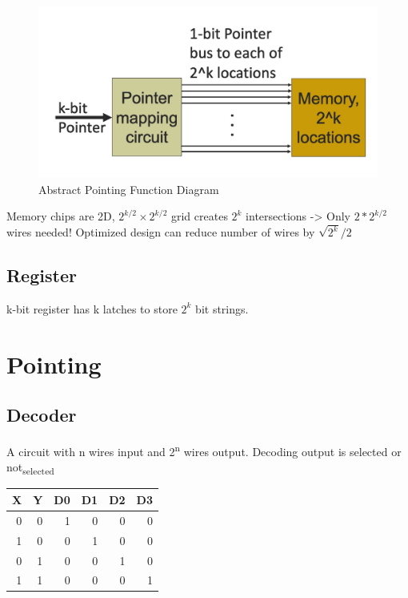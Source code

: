 \documentclass[11pt]{article}
\begin{document}
\begin{figure}[htbp]
\centering
\includegraphics[width=.9\linewidth]{./img/pointing_function.jpg}
\caption{\label{fig:org0ec129b}Abstract Pointing Function Diagram}
\end{figure}

Memory chips are 2D, \(2^{k/2} \times 2^{k/2}\) grid creates \(2^k\) intersections -> Only \(2 * 2^{k/2}\) wires needed! Optimized design can reduce number of wires by \(\sqrt{2^k} / 2\)

\subsection{Register}
\label{sec:org235d5f8}

k-bit register has k latches to store \(2^k\) bit strings.

\section{Pointing}
\label{sec:org9374411}

\subsection{Decoder}
\label{sec:org2ce7f15}

A circuit with n wires input and 2\textsuperscript{n} wires output. Decoding output is selected or not\textsubscript{selected}

\begin{center}
\begin{tabular}{rrrrrr}
X & Y & D0 & D1 & D2 & D3\\
\hline
0 & 0 & 1 & 0 & 0 & 0\\
1 & 0 & 0 & 1 & 0 & 0\\
0 & 1 & 0 & 0 & 1 & 0\\
1 & 1 & 0 & 0 & 0 & 1\\
\end{tabular}
\end{center}
\end{document}
